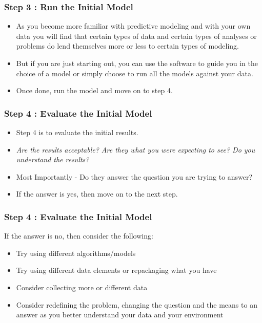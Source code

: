 \documentclass[PredictiveAnalytics101.tex]{subfiles}
\begin{document}
\begin{frame}
	\frametitle{Step 3 : Run the Initial Model}
\Large
	\begin{itemize}
\item As you become more familiar with predictive modeling and with
your own data you will find that certain types of data and certain types of analyses or problems do lend
themselves more or less to certain types of modeling. 
\item But if you are just starting out, you can use the
software to guide you in the choice of a model or simply choose to run all the models against your data.
\item Once done, run the model and move on to step 4.
	\end{itemize}

\end{frame}
\begin{frame}
\frametitle{Step 4 : Evaluate the Initial Model}
\Large
\begin{itemize}
\item Step 4 is to evaluate the initial results. 
\item \textit{Are the results acceptable? Are they what you were expecting
to see? Do you understand the results?} 
\item Most Importantly - Do they answer the question you are trying to answer? 
\item If the
answer is yes, then move on to the next step.
\end{itemize}
 
\end{frame}
\begin{frame}
\frametitle{Step 4 : Evaluate the Initial Model}
\Large
If the answer is no, then consider the following:
\begin{itemize}
\item Try using different algorithms/models
\item Try using different data elements or repackaging what you have
\item Consider collecting more or different data
\item Consider redefining the problem, changing the question and the means to an answer as you
better understand your data and your environment
\end{itemize}
\end{frame}
\end{document}

